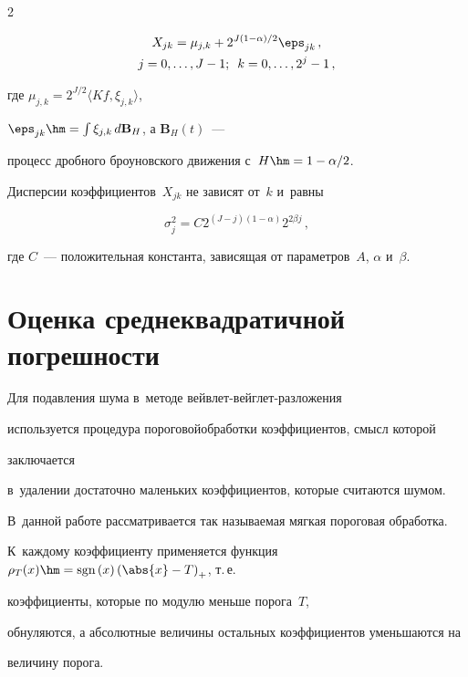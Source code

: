 \begin{multicols}{2}
\noindent

\begin{multline*}

X_{jk} = \mu_{j,k} + 2^{J(1-\alpha)/2} 

\eps_{jk}\,, \\

j=0,\ldots,J-1;\enskip k=0,\ldots,2^j-1\,,

\end{multline*}

где $\mu_{j,k} = 2^{J/2}\langle Kf, \xi_{j,k}\rangle$, 

$\eps_{jk} \hm= \int \xi_{j,k}\, d \mathbf{B}_H$, а $\mathbf{B}_H(t)$~--- 

процесс дробного броуновского движения с~$H \hm= 1-\alpha/2$.

Дисперсии коэффициентов~$X_{jk}$ не зависят от~$k$ и~равны~\cite{10-sh1}

$$

\sigma^2_{j} = C 2^{(J - j)(1 - \alpha)} 2^{2\beta j}\,,

$$

где $C$~--- положительная константа, зависящая от параметров~$A$, $\alpha$ и~$\beta$.



\section{Оценка среднеквадратичной погрешности}



Для подавления шума в~методе вейв\-лет-вейг\-лет-раз\-ло\-же\-ния 

используется процедура пороговой\linebreak обработ\-ки коэффициентов, смысл которой

 заклю\-чается 

в~удалении достаточно маленьких коэффициентов, которые считаются шумом. 

В~данной работе рассматривается так называемая мягкая пороговая обработка. 

К~каждому ко\-эф\-фи\-ци\-ен\-ту применяется функция $\rho_{T}(x)\hm=

\textrm{sgn}\,(x)\left(\abs{x}-T\right)_{+}$, т.\,е.\ 

коэффициенты, которые по модулю меньше порога~$T$, 

обнуляются, а абсолютные величины остальных коэффициентов уменьшаются на 

величину порога.




\end{multicols}
